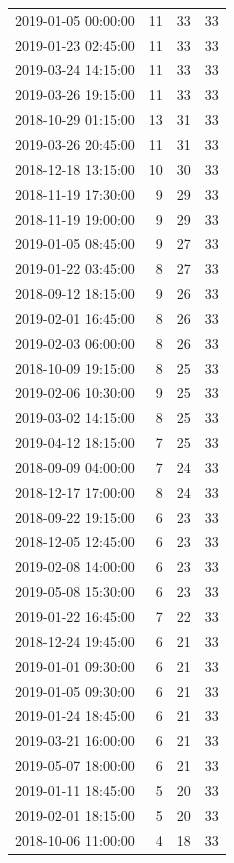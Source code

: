 \begin{tabular}{lrrr}
2019-01-05 00:00:00 & 11 & 33 & 33 \\
2019-01-23 02:45:00 & 11 & 33 & 33 \\
2019-03-24 14:15:00 & 11 & 33 & 33 \\
2019-03-26 19:15:00 & 11 & 33 & 33 \\
2018-10-29 01:15:00 & 13 & 31 & 33 \\
2019-03-26 20:45:00 & 11 & 31 & 33 \\
2018-12-18 13:15:00 & 10 & 30 & 33 \\
2018-11-19 17:30:00 & 9 & 29 & 33 \\
2018-11-19 19:00:00 & 9 & 29 & 33 \\
2019-01-05 08:45:00 & 9 & 27 & 33 \\
2019-01-22 03:45:00 & 8 & 27 & 33 \\
2018-09-12 18:15:00 & 9 & 26 & 33 \\
2019-02-01 16:45:00 & 8 & 26 & 33 \\
2019-02-03 06:00:00 & 8 & 26 & 33 \\
2018-10-09 19:15:00 & 8 & 25 & 33 \\
2019-02-06 10:30:00 & 9 & 25 & 33 \\
2019-03-02 14:15:00 & 8 & 25 & 33 \\
2019-04-12 18:15:00 & 7 & 25 & 33 \\
2018-09-09 04:00:00 & 7 & 24 & 33 \\
2018-12-17 17:00:00 & 8 & 24 & 33 \\
2018-09-22 19:15:00 & 6 & 23 & 33 \\
2018-12-05 12:45:00 & 6 & 23 & 33 \\
2019-02-08 14:00:00 & 6 & 23 & 33 \\
2019-05-08 15:30:00 & 6 & 23 & 33 \\
2019-01-22 16:45:00 & 7 & 22 & 33 \\
2018-12-24 19:45:00 & 6 & 21 & 33 \\
2019-01-01 09:30:00 & 6 & 21 & 33 \\
2019-01-05 09:30:00 & 6 & 21 & 33 \\
2019-01-24 18:45:00 & 6 & 21 & 33 \\
2019-03-21 16:00:00 & 6 & 21 & 33 \\
2019-05-07 18:00:00 & 6 & 21 & 33 \\
2019-01-11 18:45:00 & 5 & 20 & 33 \\
2019-02-01 18:15:00 & 5 & 20 & 33 \\
2018-10-06 11:00:00 & 4 & 18 & 33 \\

\end{tabular}
